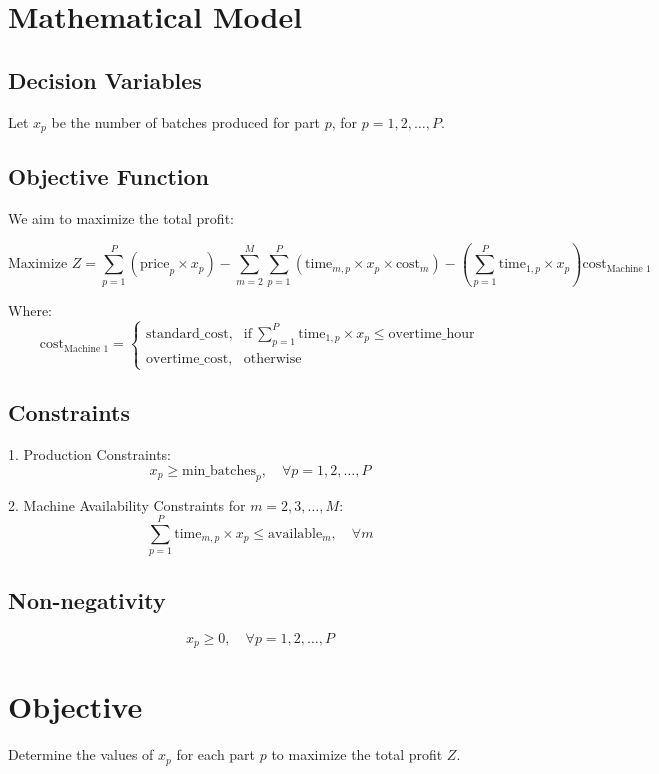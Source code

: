 \documentclass{article}
\begin{document}
\section*{Mathematical Model}

\subsection*{Decision Variables}
Let \( x_p \) be the number of batches produced for part \( p \), for \( p = 1, 2, \ldots, P \).

\subsection*{Objective Function}
We aim to maximize the total profit:

\[
\text{Maximize } Z = \sum_{p=1}^{P} \left( \text{price}_p \times x_p \right) - \sum_{m=2}^{M} \sum_{p=1}^{P} \left( \text{time}_{m,p} \times x_p \times \text{cost}_m \right) - \left( \sum_{p=1}^{P} \text{time}_{1,p} \times x_p \right) \text{cost}_{\text{Machine 1}}
\]

Where:
\[
\text{cost}_{\text{Machine 1}} = 
\begin{cases} 
\text{standard\_cost}, & \text{if} \ \sum_{p=1}^{P} \text{time}_{1,p} \times x_p \leq \text{overtime\_hour} \\
\text{overtime\_cost}, & \text{otherwise}
\end{cases}
\]

\subsection*{Constraints}

1. Production Constraints:
   \[
   x_p \geq \text{min\_batches}_p, \quad \forall p = 1, 2, \ldots, P
   \]

2. Machine Availability Constraints for \( m = 2, 3, \ldots, M \):
   \[
   \sum_{p=1}^{P} \text{time}_{m,p} \times x_p \leq \text{available}_m, \quad \forall m
   \]

\subsection*{Non-negativity}
\[
x_p \geq 0, \quad \forall p = 1, 2, \ldots, P
\]

\section*{Objective}
Determine the values of \( x_p \) for each part \( p \) to maximize the total profit \( Z \).
\end{document}
